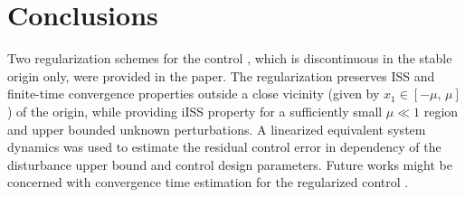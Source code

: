 \documentclass[letterpaper, 10 pt, conference]{ieeeconf}  %
\begin{document}
\section{Conclusions}
\label{sec:4}

Two regularization schemes for the control \cite{ruderman2024robust}, which is discontinuous in the stable origin only, were provided in the paper. The regularization preserves ISS and finite-time convergence properties outside a close vicinity (given by $x_1 \in [-\mu, \, \mu]$) of the origin, while providing iISS property for a sufficiently small $\mu \ll 1$ region and upper bounded unknown perturbations. A linearized equivalent system dynamics was used to estimate the residual control error in dependency of the disturbance upper bound and control design parameters. 
Future works might be concerned with convergence time estimation for the regularized control \cite{ruderman2024robust}. 




\end{document}
